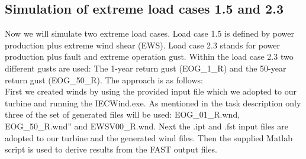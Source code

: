 \documentclass[10pt]{article}
\begin{document}
\subsection{Simulation of extreme load cases 1.5 and 2.3}
Now we will simulate two extreme load cases. Load case 1.5 is defined by power production plus extreme wind shear (EWS). Load case 2.3 stands for power production plus fault and extreme operation gust.
Within the load case 2.3 two different gusts are used: The 1-year return gust
(EOG\_1\_R) and the 50-year return gust (EOG\_50\_R). The approach is as follows: \\

First we created winds by using the provided input file which we adopted to our turbine and running the IECWind.exe. As mentioned in the task description only three of the set of generated files will be used: EOG\_01\_R.wnd, EOG\_50\_R.wnd” and EWSV00\_R.wnd. Next the .ipt and .fst input files are adopted to our turbine and the generated wind files. Then the supplied Matlab script is used to derive results from the FAST output files. 
\end{document}
